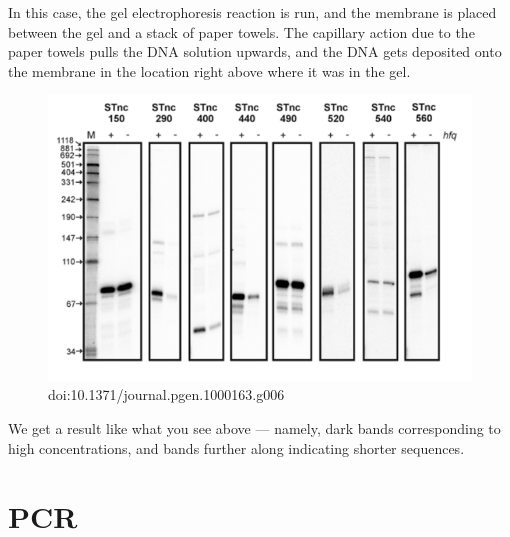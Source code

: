 \documentclass{article}
\begin{document}
In this case, the gel electrophoresis reaction is run, and the membrane is placed between the gel
and a stack of paper towels. The capillary action due to the paper towels pulls the DNA solution
upwards, and the DNA gets deposited onto the membrane in the location right above where it was in
the gel.

\begin{figure}[h!]
    \centering
    \includegraphics[scale=0.25]{images/gel-blotting-result.png}
    \caption{
        doi:10.1371/journal.pgen.1000163.g006
    }
\end{figure}

We get a result like what you see above --- namely, dark bands corresponding to high concentrations,
and bands further along indicating shorter sequences.

\section*{PCR}
\end{document}
